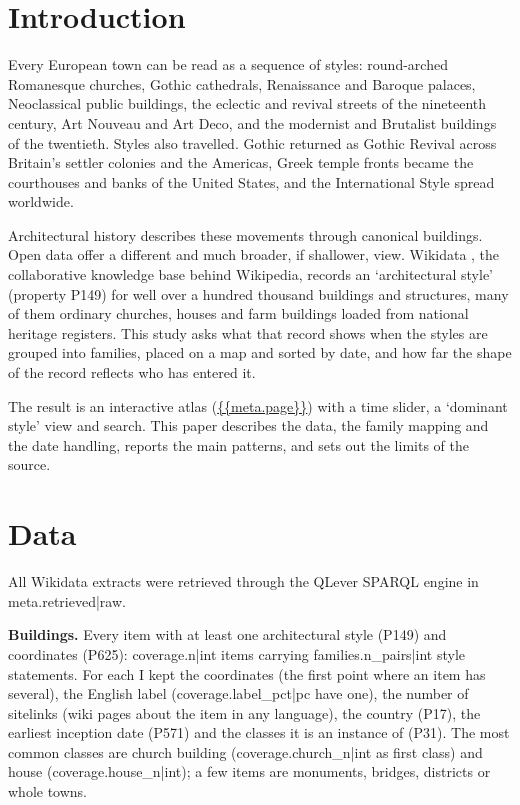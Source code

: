\documentclass[11pt,a4paper]{article}
\begin{document}
\section{Introduction}
Every European town can be read as a sequence of styles: round-arched Romanesque churches, Gothic cathedrals, Renaissance and Baroque palaces, Neoclassical public buildings, the eclectic and revival streets of the nineteenth century, Art Nouveau and Art Deco, and the modernist and Brutalist buildings of the twentieth. Styles also travelled. Gothic returned as Gothic Revival across Britain's settler colonies and the Americas, Greek temple fronts became the courthouses and banks of the United States, and the International Style spread worldwide.

Architectural history describes these movements through canonical buildings. Open data offer a different and much broader, if shallower, view. Wikidata \citep{wikidata}, the collaborative knowledge base behind Wikipedia, records an `architectural style' (property P149) for well over a hundred thousand buildings and structures, many of them ordinary churches, houses and farm buildings loaded from national heritage registers. This study asks what that record shows when the styles are grouped into families, placed on a map and sorted by date, and how far the shape of the record reflects who has entered it.

The result is an interactive atlas (\url{{{meta.page}}}) with a time slider, a `dominant style' view and search. This paper describes the data, the family mapping and the date handling, reports the main patterns, and sets out the limits of the source.

\section{Data}
All Wikidata extracts were retrieved through the QLever SPARQL engine \citep{qlever} in {{meta.retrieved|raw}}.

\textbf{Buildings.} Every item with at least one architectural style (P149) and coordinates (P625): {{coverage.n|int}} items carrying {{families.n_pairs|int}} style statements. For each I kept the coordinates (the first point where an item has several), the English label ({{coverage.label_pct|pc}} have one), the number of sitelinks (wiki pages about the item in any language), the country (P17), the earliest inception date (P571) and the classes it is an instance of (P31). The most common classes are church building ({{coverage.church_n|int}} as first class) and house ({{coverage.house_n|int}}); a few items are monuments, bridges, districts or whole towns.
\end{document}
